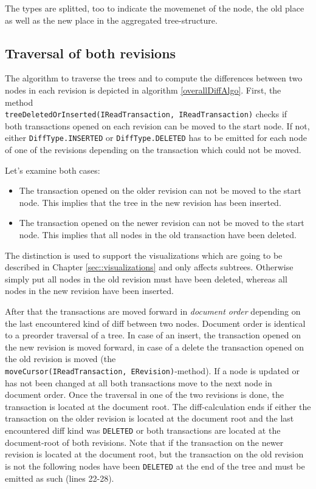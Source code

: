 The types are splitted, too to indicate the movemenet of the node, the old place as well as the new place in the aggregated tree-structure.

\subsection{Traversal of both revisions}
The algorithm to traverse the trees and to compute the differences between two nodes in each revision is depicted in algorithm \ref{overallDiffAlgo}. First, the method\\ \texttt{treeDeletedOrInserted(IReadTransaction, IReadTransaction)} checks if\\ both transactions opened on each revision can be moved to the start node. If not, either \texttt{DiffType.INSERTED} or \texttt{DiffType.DELETED} has to be emitted for each node of one of the revisions depending on the transaction which could not be moved.

Let's examine both cases:
\begin{itemize}
\item
The transaction opened on the older revision can not be moved to the start node. This implies that the tree in the new revision has been inserted.
\item
The transaction opened on the newer revision can not be moved to the start node. This implies that all nodes in the old transaction have been deleted.
\end{itemize}

The distinction is used to support the visualizations which are going to be described in Chapter \ref{sec::visualizations} and only affects subtrees. Otherwise simply put all nodes in the old revision must have been deleted, whereas all nodes in the new revision have been inserted.

After that the transactions are moved forward in \emph{document order} depending on the last encountered kind of diff between two nodes. Document order is identical to a preorder traversal of a tree. In case of an insert, the transaction opened on the new revision is moved forward, in case of a delete the transaction opened on the old revision is moved (the \\ \texttt{moveCursor(IReadTransaction, ERevision)}-method). If a node is updated or has not been changed at all both transactions move to the next node in document order. Once the traversal in one of the two revisions is done, the transaction is located at the document root. The diff-calculation ends if either the transaction on the older revision is located at the document root and the last encountered diff kind was \texttt{DELETED} or both transactions are located at the document-root of both revisions. Note that if the transaction on the newer revision is located at the document root, but the transaction on the old revision is not the following nodes have been \texttt{DELETED} at the end of the tree and must be emitted as such (lines 22-28). 

